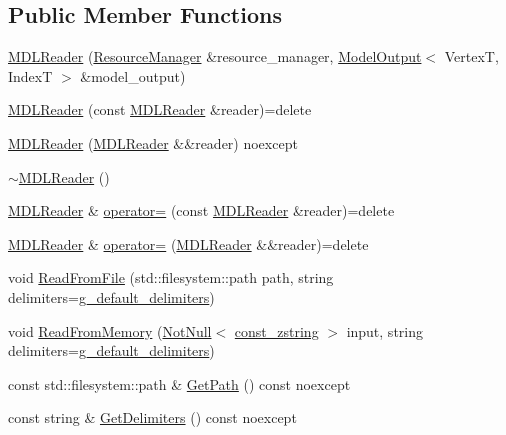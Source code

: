\subsection*{Public Member Functions}
\begin{DoxyCompactItemize}
\item 
\mbox{\hyperlink{classmage_1_1rendering_1_1loader_1_1_m_d_l_reader_acc6d10b858b43608cb22d9086ae227fd}{M\+D\+L\+Reader}} (\mbox{\hyperlink{classmage_1_1rendering_1_1_resource_manager}{Resource\+Manager}} \&resource\+\_\+manager, \mbox{\hyperlink{structmage_1_1rendering_1_1_model_output}{Model\+Output}}$<$ VertexT, IndexT $>$ \&model\+\_\+output)
\item 
\mbox{\hyperlink{classmage_1_1rendering_1_1loader_1_1_m_d_l_reader_a98d83bb5d8cec2b8e665f08bc50068f6}{M\+D\+L\+Reader}} (const \mbox{\hyperlink{classmage_1_1rendering_1_1loader_1_1_m_d_l_reader}{M\+D\+L\+Reader}} \&reader)=delete
\item 
\mbox{\hyperlink{classmage_1_1rendering_1_1loader_1_1_m_d_l_reader_a77f5be43642636faf71e7fb3eed7e050}{M\+D\+L\+Reader}} (\mbox{\hyperlink{classmage_1_1rendering_1_1loader_1_1_m_d_l_reader}{M\+D\+L\+Reader}} \&\&reader) noexcept
\item 
\mbox{\hyperlink{classmage_1_1rendering_1_1loader_1_1_m_d_l_reader_a2f4c6bd8c2ef49180538ddfe5530e230}{$\sim$\+M\+D\+L\+Reader}} ()
\item 
\mbox{\hyperlink{classmage_1_1rendering_1_1loader_1_1_m_d_l_reader}{M\+D\+L\+Reader}} \& \mbox{\hyperlink{classmage_1_1rendering_1_1loader_1_1_m_d_l_reader_a76e89824650cdf1d737048ac06862166}{operator=}} (const \mbox{\hyperlink{classmage_1_1rendering_1_1loader_1_1_m_d_l_reader}{M\+D\+L\+Reader}} \&reader)=delete
\item 
\mbox{\hyperlink{classmage_1_1rendering_1_1loader_1_1_m_d_l_reader}{M\+D\+L\+Reader}} \& \mbox{\hyperlink{classmage_1_1rendering_1_1loader_1_1_m_d_l_reader_a2afa24fc79ecdcf15f0cbf09f7a78e52}{operator=}} (\mbox{\hyperlink{classmage_1_1rendering_1_1loader_1_1_m_d_l_reader}{M\+D\+L\+Reader}} \&\&reader)=delete
\item 
void \mbox{\hyperlink{classmage_1_1rendering_1_1loader_1_1_m_d_l_reader_ad4236487534d5dba6582613317317092}{Read\+From\+File}} (std\+::filesystem\+::path path, string delimiters=\mbox{\hyperlink{namespacemage_aa161198415efd9349da6187663250aea}{g\+\_\+default\+\_\+delimiters}})
\item 
void \mbox{\hyperlink{classmage_1_1rendering_1_1loader_1_1_m_d_l_reader_a5aa9068792817b6d6dc840a44b788159}{Read\+From\+Memory}} (\mbox{\hyperlink{namespacemage_a8769f9d670d6b585ea306cb1062af94b}{Not\+Null}}$<$ \mbox{\hyperlink{namespacemage_abfd9206dc607ceb5d13ec68bf075a5c0}{const\+\_\+zstring}} $>$ input, string delimiters=\mbox{\hyperlink{namespacemage_aa161198415efd9349da6187663250aea}{g\+\_\+default\+\_\+delimiters}})
\item 
const std\+::filesystem\+::path \& \mbox{\hyperlink{classmage_1_1rendering_1_1loader_1_1_m_d_l_reader_a9740b3cecdcf5a27c696a08eef3b09da}{Get\+Path}} () const noexcept
\item 
const string \& \mbox{\hyperlink{classmage_1_1rendering_1_1loader_1_1_m_d_l_reader_aa00e1e27b614e11ec9f70e52d0bac551}{Get\+Delimiters}} () const noexcept
\end{DoxyCompactItemize}
